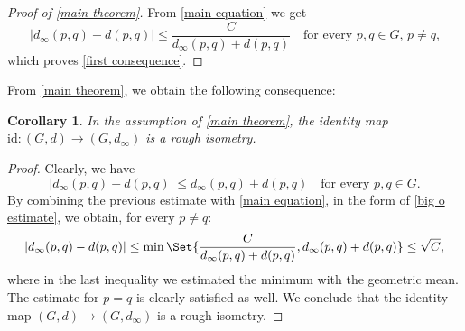 \documentclass[a4paper,11pt,reqno]{amsart}
\theoremstyle{plain}
\newtheorem{corollary}[theorem]{Corollary}
\theoremstyle{definition}
\newcommand{\coloneq}{\coloneqq}
\begin{document}
\begin{proof}[Proof of \cref{main theorem}]
From \eqref{main equation} we get
\begin{equation} \label{big o estimate}
 \left\lvert d_\infty(p,q) - d(p,q) \right\rvert \le \frac{C}{d_\infty(p,q) + d(p,q)} \quad \text{for every $p,q \in G, \, p \neq q$,}
 \end{equation} 
 which proves \eqref{first consequence}. 
\end{proof}

From \cref{main theorem}, we obtain the following consequence:

\begin{corollary} \label{bounded distance cor}
In the assumption of \cref{main theorem}, 
 the identity map $\mathrm{id} \colon (G,d) \to (G,d_\infty)$ is a rough isometry. 
	 \end{corollary}

\begin{proof}
 Clearly, we have 
 \begin{equation*}
 \left\lvert d_\infty(p,q) - d(p,q) \right\rvert \le d_\infty(p,q) + d(p,q) \quad \text{for every $p,q \in G$.}
 \end{equation*}
By combining the previous estimate with \eqref{main equation}, in the form of \eqref{big o estimate}, we obtain, for every $p \neq q$:
\begin{equation*} 
 \left\lvert d_\infty(p,q) - d(p,q) \right\rvert \le \min \Set{\frac{C}{d_\infty(p,q) + d(p,q)},d_\infty(p,q) + d(p,q)} \le \sqrt{C},
\end{equation*}
where in the last inequality we estimated the minimum with the geometric mean. The estimate for $p=q$ is clearly satisfied as well. We conclude that the identity map $(G,d) \to (G,d_\infty)$ is a rough isometry.
\end{proof} 
\end{document}
